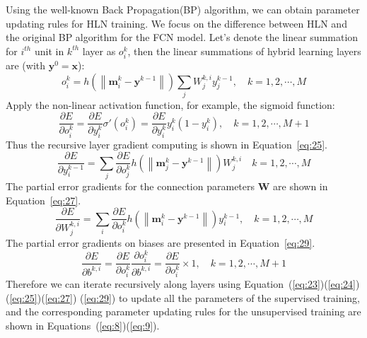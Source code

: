 \documentclass[3p,times,procedia]{elsarticle}
\begin{document}
Using the well-known Back 
Propagation(BP)
algorithm, we can obtain parameter 
updating
rules for HLN training.
We focus on the difference between HLN
and the original BP algorithm for 
the FCN model.
Let's denote the linear summation 
for $i^{th}$ unit
in $k^{th}$ layer as $o_i^k$, then
the linear summations of hybrid learning
layers are (with $\mathbf{y}^0=\mathbf{x}$):
\begin{equation}
	o_i^k =
	h\left(
	\left\|
	\mathbf{m}_i^k-\mathbf{y}^{k-1}
	\right\|
	\right)
	\sum_j 
	W_j^{k,i}
	y_j^{k-1},
	\quad k=1,2,\cdots,M
	\label{eq:23}
\end{equation}
Apply the non-linear activation 
function, for example, the sigmoid
function:
\begin{equation}
	\frac{\partial E}
	{\partial o_i^k}=
	\frac{\partial E}
	{\partial y_i^k}
	\sigma'(o_i^k)=
	\frac{\partial E}
	{\partial y_i^k}
	y_i^k\left(
	1-y_i^k
	\right),
	\quad k=1,2,\cdots,M+1
	\label{eq:24}
\end{equation}
Thus the recursive layer gradient 
computing is shown in 
Equation~\ref{eq:25}.
\begin{equation}
	\frac{\partial E}
	{\partial y_i^{k-1}}=\sum_j
	\frac{\partial E}
	{\partial o_j^k}
	h\left(
	\left\|
	\mathbf{m}_j^k-
	\mathbf{y}^{k-1}
	\right\|
	\right)
	W_j^{k,i}
	\quad k=1,2,\cdots,M
	\label{eq:25}
\end{equation}
The partial error gradients for the
connection parameters $\mathbf{W}$
are shown in Equation~\ref{eq:27}.
\begin{equation}
	\frac{\partial E}
	{\partial W_j^{k,i}}=\sum_i
	\frac{\partial E}
	{\partial o_i^k}
	h\left(
	\left\|
	\mathbf{m}_i^k-
	\mathbf{y}^{k-1}
	\right\|
	\right)
	y_i^{k-1},
	\quad k=1,2,\cdots,M
	\label{eq:27}
\end{equation}
The partial error gradients 
on biases are presented in 
Equation~\ref{eq:29}.
\begin{equation}
	\frac{\partial E}
	{\partial b^{k,i}}=
	\frac{\partial E}
	{\partial o_i^k}
	\frac{\partial o_i^k}
	{\partial b^{k,i}}=
	\frac{\partial E}
	{\partial o_i^k}
	\times 1,
	\quad k=1,2,\cdots,M+1
	\label{eq:29}
\end{equation}
Therefore we can iterate 
recursively along layers using
Equation~(\ref{eq:23})(\ref{eq:24})
(\ref{eq:25})(\ref{eq:27})
(\ref{eq:29}) to 
update all the parameters of 
the supervised 
training, and the corresponding 
parameter updating rules 
for the unsupervised 
training are shown in 
Equations~(\ref{eq:8})(\ref{eq:9}).
\end{document}
